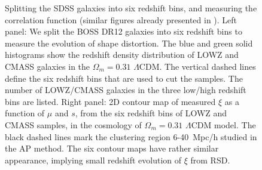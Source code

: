 \documentclass[iop]{emulateapj}
\begin{document}
\begin{figure}
   \caption{\label{fig_TpCF}
   Splitting the SDSS galaxies into six redshift bins, and measuring the correlation function
   (similar figures already presented in \cite{Li2016}).
   Left panel: We split the BOSS DR12 galaxies into six redshift bins to measure the evolution of shape distortion.
   The blue and green solid histograms show the redshift density distribution of LOWZ and CMASS galaxies in the $\Omega_m=0.31$ $\Lambda$CDM. 
   The vertical dashed lines define the six redshift bins that are used to cut the samples.
   The number of LOWZ/CMASS galaxies in the three low/high redshift bins are listed.
   Right panel: 2D contour map of measured $\xi$ as a function of $\mu$ and $s$, from the six redshift bins of LOWZ and CMASS samples, 
      in the cosmology of $\Omega_m=0.31$ $\Lambda$CDM model.
    The black dashed lines mark the clustering region 6-40\ Mpc/h studied in the AP method.
    The six contour maps have rather similar appearance, implying small redshift evolution of $\xi$ from RSD.
   }
\end{figure}
\end{document}
